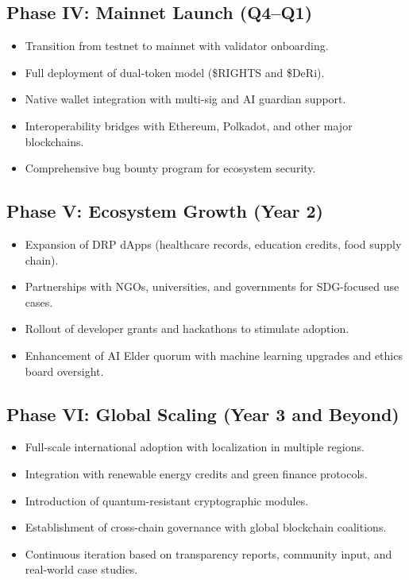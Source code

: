 \documentclass[11pt,a4paper]{article}
\begin{document}
\subsection{Phase IV: Mainnet Launch (Q4–Q1)}
\begin{itemize}
    \item Transition from testnet to mainnet with validator onboarding.  
    \item Full deployment of dual-token model (\$RIGHTS and \$DeRi).  
    \item Native wallet integration with multi-sig and AI guardian support.  
    \item Interoperability bridges with Ethereum, Polkadot, and other major blockchains.  
    \item Comprehensive bug bounty program for ecosystem security.  
\end{itemize}

\subsection{Phase V: Ecosystem Growth (Year 2)}
\begin{itemize}
    \item Expansion of DRP dApps (healthcare records, education credits, food supply chain).  
    \item Partnerships with NGOs, universities, and governments for SDG-focused use cases.  
    \item Rollout of developer grants and hackathons to stimulate adoption.  
    \item Enhancement of AI Elder quorum with machine learning upgrades and ethics board oversight.  
\end{itemize}

\subsection{Phase VI: Global Scaling (Year 3 and Beyond)}
\begin{itemize}
    \item Full-scale international adoption with localization in multiple regions.  
    \item Integration with renewable energy credits and green finance protocols.  
    \item Introduction of quantum-resistant cryptographic modules.  
    \item Establishment of cross-chain governance with global blockchain coalitions.  
    \item Continuous iteration based on transparency reports, community input, and real-world case studies.  
\end{itemize}
\end{document}
